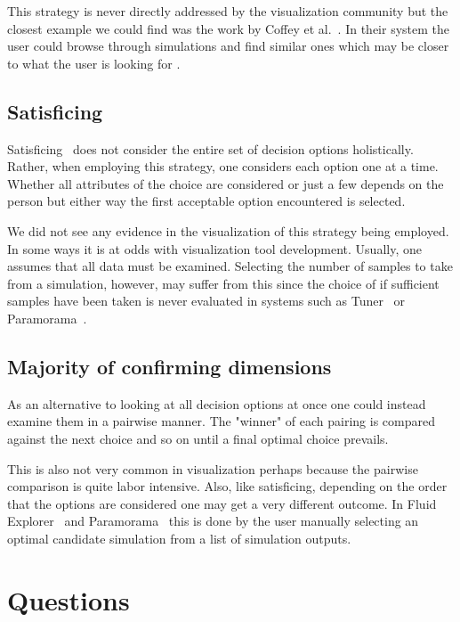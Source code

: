 This strategy is never directly addressed by the visualization community
but the closest example we could find was the work by 
Coffey et al.~\citep{Coffey:2013}. In their system the user could browse
through simulations and find similar ones which may be closer to what
the user is looking for .

\subsection{Satisficing}\label{satisficing}

Satisficing~ does not consider the entire set of decision options
holistically. Rather, when employing this strategy, one considers each 
option one at a time. Whether all attributes of the choice are considered or
just a few depends on the person but either way the first acceptable option
encountered is selected.

We did not see any evidence in the visualization of this strategy being
employed. In some ways it is at odds with visualization tool development.
Usually, one assumes that all data must be examined. Selecting the number
of samples to take from a simulation, however, may suffer from this since
the choice of if sufficient samples have been taken is never evaluated
in systems such as Tuner~\citep{Torsney-Weir:2011} or 
Paramorama~\citep{Pretorius:2011}. 

\subsection{Majority of confirming
dimensions}\label{majority-of-confirming-dimensions}

As an alternative to looking at all decision options at once one could 
instead examine them in a pairwise manner. The "winner" of each pairing is
compared against the next choice and so on until a final optimal choice
prevails.

This is also not very common in visualization perhaps because the pairwise
comparison is quite labor intensive. Also, like satisficing, depending on the
order that the options are considered one may get a very different outcome. In
Fluid Explorer~\cite{Bruckner:2010} and Paramorama~\citep{Pretorius:2011} this
is done by the user manually selecting an optimal candidate simulation from 
a list of simulation outputs.


\section{Questions}\label{questions}

